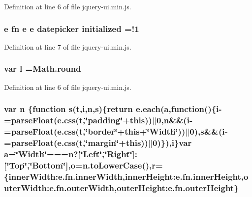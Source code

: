 {{Definition at line 6 of file jquery-\/ui.\+min.\+js.

\subsubsection[{\texorpdfstring{initialized}{initialized}}]{ {\bf e} {\bf fn} {\bf e} {\bf e} {\bf datepicker} initialized =!1}\hypertarget{jquery-ui_8min_8js_ac19fa917ae8a3c006db80aeff33be883}{}\label{jquery-ui_8min_8js_ac19fa917ae8a3c006db80aeff33be883}


Definition at line 7 of file jquery-\/ui.\+min.\+js.

\subsubsection[{\texorpdfstring{l}{l}}]{\setlength{\rightskip}{0pt plus 5cm}var l =Math.\+round}\hypertarget{jquery-ui_8min_8js_ae5e71a2600e8891c54854be157cc6626}{}\label{jquery-ui_8min_8js_ae5e71a2600e8891c54854be157cc6626}


Definition at line 6 of file jquery-\/ui.\+min.\+js.

\subsubsection[{\texorpdfstring{n}{n}}]{\setlength{\rightskip}{0pt plus 5cm}var n \{function {\bf s}({\bf t},{\bf i},n,{\bf s})\{return {\bf e.\+each}({\bf a},function()\{{\bf i}-\/=parse\+Float(e.\+css({\bf t},\char`\"{}padding\char`\"{}+this))$\vert$$\vert$0,n\&\&({\bf i}-\/=parse\+Float(e.\+css({\bf t},\char`\"{}border\char`\"{}+this+\char`\"{}Width\char`\"{}))$\vert$$\vert$0),s\&\&({\bf i}-\/=parse\+Float(e.\+css({\bf t},\char`\"{}margin\char`\"{}+this))$\vert$$\vert$0)\}),{\bf i}\}var {\bf a}=\char`\"{}Width\char`\"{}===n?\mbox{[}\char`\"{}Left\char`\"{},\char`\"{}Right\char`\"{}\mbox{]}\+:\mbox{[}\char`\"{}Top\char`\"{},\char`\"{}Bottom\char`\"{}\mbox{]},o=n.\+to\+Lower\+Case(),{\bf r}=\{inner\+Width\+:e.\+fn.\+inner\+Width,inner\+Height\+:e.\+fn.\+inner\+Height,outer\+Width\+:e.\+fn.\+outer\+Width,outer\+Height\+:e.\+fn.\+outer\+Height\}}\hypertarget{jquery-ui_8min_8js_a3c7365c007156a2a63223e3c9909fbf8}{}\label{jquery-ui_8min_8js_a3c7365c007156a2a63223e3c9909fbf8}


}}
